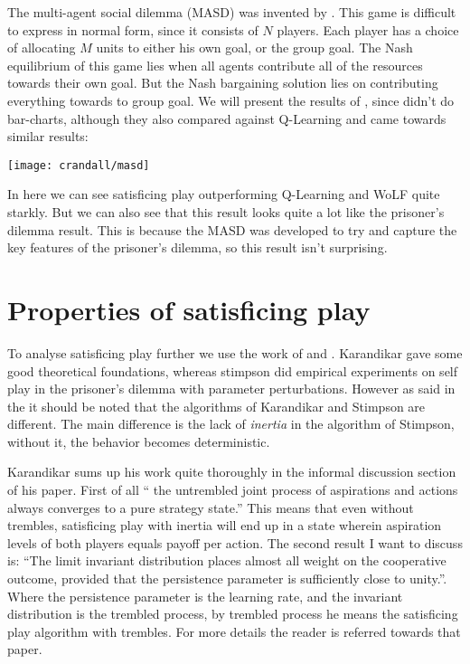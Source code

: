 \cleared The multi-agent social dilemma (MASD) was invented by
\citep{stimpson:2003}. This game
is difficult to express in normal form, since it consists of $N$ players.
Each player has a choice of allocating $M$ units to either his own goal, 
or the group goal. The Nash equilibrium of this game lies when all agents
contribute all of the resources towards their own goal. But the Nash bargaining
solution lies on contributing everything towards to group goal. We will present
the results of \citep{crandall}, since \citep{stimpson:2003} didn't do
bar-charts, although they also compared against Q-Learning and came towards
similar results:

\noindent
\texttt{[image: crandall/masd]}

\cleared In here we can see satisficing play outperforming Q-Learning and WoLF quite
starkly. But we can also see that this result looks quite a lot like the
prisoner's dilemma result. This is because the MASD was developed
to try and capture the key features of the prisoner's dilemma,
so this result isn't surprising.

\section{Properties of satisficing play}
\cleared 
To analyse satisficing play further we use the work of \citep{karandikar} and
\citep{stimpson:2001}. Karandikar gave some good theoretical foundations,
whereas stimpson did empirical experiments on self play in the
prisoner's dilemma with parameter perturbations. However as said in the
 it should be noted
that the algorithms of Karandikar and Stimpson are different. The main
difference is the lack of \emph{inertia} in the algorithm of Stimpson, without 
it, the behavior becomes deterministic.

\cleared Karandikar sums up his work quite thoroughly in  the informal
discussion section of his paper. First of all
``   the untrembled joint process of
aspirations and actions always converges to a pure strategy state.''
This means that even without trembles, satisficing play with inertia
will end up in a state wherein aspiration levels of both players equals payoff
per action.
The second result I want to discuss is:
``The limit invariant distribution places
almost all weight on the cooperative outcome, provided that the persistence
parameter is sufficiently close to unity.''. Where the persistence parameter
is the learning rate, and the invariant distribution is the trembled process,
by trembled process he means the satisficing play algorithm with trembles.
For more details the reader is referred towards that paper.

